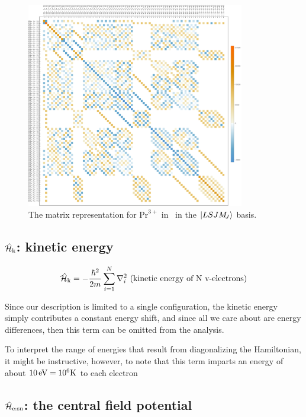 \documentclass{article}
\begin{document}
\begin{figure}[h!]
	\begin{center}
		\includegraphics[width=0.85\textwidth]{Prplot.pdf}
	\end{center}
	\caption{The matrix representation for $\text{Pr}^{3+}$ in \LaFthree \, in the $|LSJM_{\!{J}}\rangle$ basis.}
	\label{fig:Pr_in_LaF3} 
\end{figure}

\subsection{$\hat{\mathcal{H}}_\text{k}$: kinetic energy}

    \begin{equation}
        \hat{\mathcal{H}}_\text{k} = -\frac{\hbar^2}{2m}\sum_{i=1}^N \nabla_i^2 \text{ (kinetic energy of N v-electrons)}
    \end{equation}

    Since our description is limited to a single configuration, the kinetic energy simply contributes a constant energy shift, and since all we care about are energy differences, then this term can be omitted from the analysis.
    
    To interpret the range of energies that result from diagonalizing the Hamiltonian, it might be instructive, however, to note that this term imparts an energy of about $10\,\text{eV} = 10^6 \text{K}$ to each electron

\subsection{$\hat{\mathcal{H}}_\text{e:sn}$: the central field potential}
\end{document}
